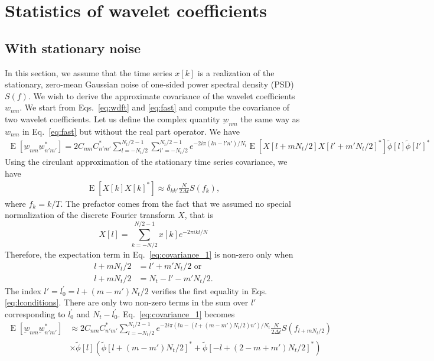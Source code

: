 \documentclass{article}
\begin{document}
\section{Statistics of wavelet coefficients}

\subsection{With stationary noise}

In this section, we assume that the time series $x[k]$ is a realization of the stationary, zero-mean Gaussian noise of one-sided power spectral density (PSD) $S(f)$. We wish to derive the approximate covariance of the wavelet coefficients $w_{nm}$. We start from Eqs.~\eqref{eq:wdft} and \eqref{eq:fast} and compute the covariance of two wavelet coefficients. Let us define the complex quantity $\underbar{w}_{nm}$ the same way as $w_{nm}$ in Eq.~\eqref{eq:fast} but without the real part operator. We have
\begin{align}
\label{eq:covariance_1}
    \operatorname{E}\left[\underbar{w}_{nm} \underbar{w}_{n'm'}^{\ast}\right] = 2 C_{n m}  C_{n' m'}^{\ast} \sum_{l=-N_t / 2}^{N_t / 2-1} \sum_{l'=-N_t / 2}^{N_t / 2-1}   e^{-2 i \pi (ln  - l' n' )/ N_t} \operatorname{E}\left[ X\left[l + m N_t / 2 \right] X\left[l' + m' N_t / 2 \right]^{\ast}  \right] \tilde{\phi}[l] \tilde{\phi}[l']^{\ast}
\end{align}
Using the circulant approximation of the stationary time series covariance, we have
\begin{align}
    \operatorname{E}\left[X[k]X[k]^{\ast}\right] \approx \delta_{k k'} \frac{N}{2 \Delta t}S(f_k),
\end{align}
where $f_k = k / T$. The prefactor comes from the fact that we assumed no special normalization of the discrete Fourier transform $X$, that is 
\begin{equation}
    X[l] = \sum_{k=-N/2}^{N/2-1} x[k] e^{-2\pi i k l / N} 
\end{equation}
Therefore, the expectation term in Eq.~\eqref{eq:covariance_1} is non-zero only when 
\begin{align}
\label{eq:lconditions}
    l + m N_t / 2 & = l' + m' N_t / 2 \text{ or} \nonumber \\
    l + m N_t / 2 & = N_t - l' - m' N_t / 2.
\end{align}
The index $l' = l^{\prime}_0 = l + (m-m') N_t / 2$ verifies the first equality in Eqs.\eqref{eq:lconditions}. There are only two non-zero terms in the sum over $l'$ corresponding to $l^{\prime}_0$ and $N_t - l^{\prime}_0$. Eq.~\eqref{eq:covariance_1}  becomes
\begin{align}
\label{eq:covariance_2}
    \operatorname{E}\left[\underbar{w}_{nm} \underbar{w}_{n'm'}^{\ast}\right] & \approx 2 C_{n m}  C_{n' m'}^{\ast} \sum_{l=-N_t / 2}^{N_t / 2-1}   e^{-2 i \pi (ln  - (l + (m-m')N_t/2 )n' )/ N_t} \frac{N}{2 \Delta t}S\left( f_{l + m N_t / 2} \right)  \nonumber \\
    & \times \tilde{\phi}[l] \left(\tilde{\phi}[l + (m-m') N_t / 2]^{\ast} + \tilde{\phi}[-l + (2 - m + m') N_t / 2]^{\ast} \right)
\end{align}
\end{document}
